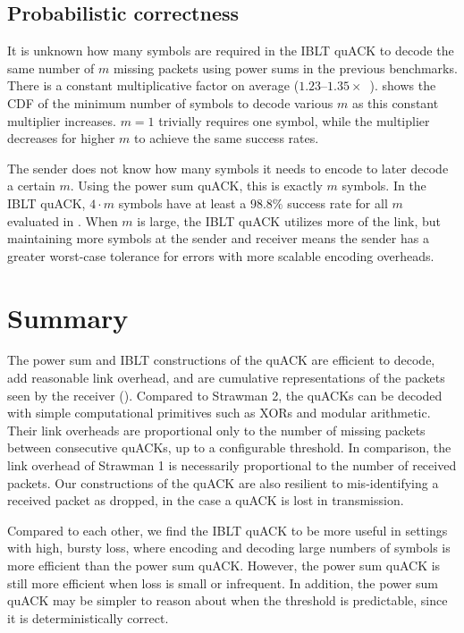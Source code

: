 \subsection{Probabilistic correctness}
\label{sec:quack:iblt-microbenchmarks:correctness}



It is unknown how many symbols are required in the IBLT quACK to decode the same
number of $m$ missing packets using power sums in the previous benchmarks.
There is a constant multiplicative factor on average
($1.23$--$1.35\times$~\cite{yang2024practical,baek2023simple}).
 shows the CDF of the minimum number of symbols to decode
various $m$ as this constant multiplier increases. $m=1$ trivially requires
one symbol, while the multiplier decreases for higher $m$ to achieve the same
success rates.

The sender does not know how many symbols it needs to encode to later decode a
certain $m$. Using the power sum quACK, this is exactly $m$ symbols. In the
IBLT quACK, $4 \cdot m$ symbols have at least a $\!98.8\%$ success rate for all
$m$ evaluated in . When $m$ is large, the IBLT quACK
utilizes more of the link, but maintaining more symbols at the sender and
receiver means the sender has a greater worst-case tolerance for errors with
more scalable encoding overheads.

\section{Summary}
\label{sec:quack:summary}




The power sum and IBLT constructions of the quACK are efficient to decode, add
reasonable link overhead, and are cumulative representations of the packets
seen by the receiver (). Compared to Strawman 2,
the quACKs can be decoded with simple computational primitives such as XORs and
modular arithmetic. Their link overheads are proportional only to the number of
missing packets between consecutive quACKs, up to a configurable threshold. In
comparison, the link overhead of Strawman 1 is necessarily proportional to the
number of received packets. Our constructions of the quACK are also resilient
to mis-identifying a received packet as dropped, in the case a quACK is lost in
transmission.

Compared to each other, we find the IBLT quACK to be more useful in settings
with high, bursty loss, where
encoding and decoding large numbers of symbols is more efficient than the
power sum quACK. However, the power sum quACK is still more efficient when
loss is small or infrequent. In addition, the power sum quACK may be simpler
to reason about when the threshold is predictable, since it is deterministically
correct.
